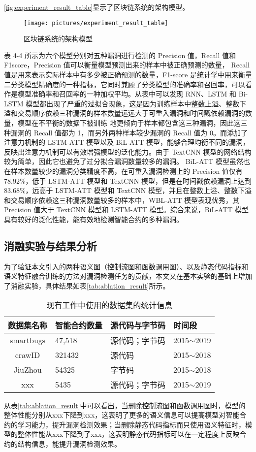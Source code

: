 \autoref{fig:experiment_result_table}显示了区块链系统的架构模型。
\begin{figure}[htbp]
    \centering
    \texttt{[image: pictures/experiment\_result\_table]}
    \caption{\label{fig:experiment_result_table}区块链系统的架构模型}
\end{figure}
表 4-4 所示为六个模型分别对五种漏洞进行检测的 Precision 值，Recall 值和 F1score，Precision 值可以衡量模型预测出来的样本中被正确预测的数量， Recall 值是用来表示实际样本中有多少被正确预测的数量，F1-score 是统计学中用来衡量二分类模型精确度的一种指标，它同时兼顾了分类模型的准确率和召回率，可以看作是模型准确率和召回率的一种加权平均。从表中可以发现 RNN、LSTM 和 Bi-LSTM 模型都出现了严重的过拟合现象，这是因为训练样本中整数上溢、整数下溢和交易顺序依赖三种漏洞的样本数量远远大于可重入漏洞和时间戳依赖漏洞的数量，模型在不平衡的数据下被训练
地更倾向于样本都包含这三种漏洞，因此这三种漏洞的 Recall 值都为 1，而另外两种样本较少漏洞的 Recall 值为 0。而添加了注意力机制的 LSTM-ATT 模型以及 BiL-ATT 模型，能够合理均衡不同的漏洞，反映出注意力机制可以有效增强模型的泛化能力。由于 TextCNN 模型的网络结构较为简单，因此它也避免了过分拟合漏洞数量较多的漏洞。 BiL-ATT 模型虽然也在样本数量较少的漏洞分类精度不高，在可重入漏洞检测上的 Precision 值仅有 78.92\%，低于 LSTM-ATT 模型和 TextCNN 模型，但是在时间戳依赖漏洞上达到 83.68\%，远高于 LSTM-ATT 模型和 TextCNN 模型，并且在整数上溢、整数下溢和交易顺序依赖这三种漏洞数量较多的样本中，WBL-ATT 模型表现优秀，其 Precision 值大于 TextCNN 模型和 LSTM-ATT 模型。综合来说，BiL-ATT 模型具有较好的泛化性能，能有效地检测智能合约的多种漏洞。 
\subsection{消融实验与结果分析}
\label{sec:消融实验与结果分析}
为了验证本文引入的两种语义图（控制流图和函数调用图）、以及静态代码指标和语义特征融合训练的方法对漏洞检测任务的贡献，本文又在基本实验的基础上增加了消融实验，具体结果如表\autoref{tab:ablation_result}所示。
\begin{table}[htbp]
    \caption{\label{tab:ablation_result}现有工作中使用的数据集的统计信息}
    \small
    \renewcommand{\arraystretch}{1.5}
    \begin{tabularx}{\linewidth}{cX<{\centering}X<{\centering}X<{\centering}}
        \hline
    数据集名称     & 智能合约数量 & 源代码与字节码 & 时间段            \\ \hline
    smartbugs & 47,518  & 源代码；字节码 & 2015$\sim$2019 \\
    crawID    & 321432 & 源代码     & 2015$\sim$2018 \\
    JiuZhou   & 54325  & 字节码     & 2015$\sim$2018 \\
    xxx       & 5435   & 源代码；字节码 & 2015$\sim$2019  \\  \hline
    \end{tabularx}
\end{table}
从表\autoref{tab:ablation_result}中可以看出，当删除控制流图和函数调用图时，模型的整体性能分别从xxx下降到xxx，这表明了更多的语义信息可以提高模型对智能合约的学习能力，提升漏洞检测效果；当删除静态代码指标而只使用语义特征时，模型的整体性能从xxx下降到了xxx，这表明静态代码指标可以在一定程度上反映合约的结构信息，能提升漏洞检测效果。